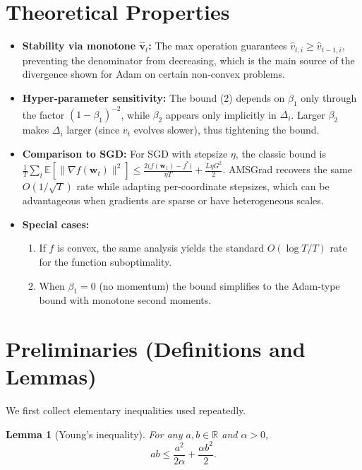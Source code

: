 \documentclass[11pt]{article}
\newtheorem{lemma}{Lemma}
\newcommand{\EE}{\mathbb{E}}
\newcommand{\RR}{\mathbb{R}}
\begin{document}
\section{Theoretical Properties}
\label{sec:properties}
\begin{itemize}[leftmargin=*]
\item \textbf{Stability via monotone $\hat{\mathbf{v}}_{t}$:}
The max operation guarantees $\hat{v}_{t,i}\ge\hat{v}_{t-1,i}$,
preventing the denominator from decreasing, which is the main
source of the divergence shown for Adam on certain non‑convex problems.

\item \textbf{Hyper‑parameter sensitivity:}
The bound (2) depends on $\beta_{1}$ only through the factor
$(1-\beta_{1})^{-2}$, while $\beta_{2}$ appears only implicitly in
$\Delta_{i}$.  Larger $\beta_{2}$ makes $\Delta_{i}$ larger (since
$v_{t}$ evolves slower), thus tightening the bound.

\item \textbf{Comparison to SGD:}
For SGD with stepsize $\eta$, the classic bound is
$\frac{1}{T}\sum_{t}\EE[\|\nabla f(\mathbf{w}_{t})\|^{2}]
\le \frac{2\bigl(f(\mathbf{w}_{1})-f^{*}\bigr)}{\eta T}
+\frac{L\eta G^{2}}{2}$.
AMSGrad recovers the same $O(1/\sqrt{T})$ rate while adapting per‑coordinate
stepsizes, which can be advantageous when gradients are sparse or have
heterogeneous scales.

\item \textbf{Special cases:}
\begin{enumerate}
\item If $f$ is convex, the same analysis yields the standard $O(\log T /T)$
rate for the function suboptimality.
\item When $\beta_{1}=0$ (no momentum) the bound simplifies to the
Adam‑type bound with monotone second moments.
\end{enumerate}
\end{itemize}

\section{Preliminaries (Definitions and Lemmas)}
\label{sec:prelim}
We first collect elementary inequalities used repeatedly.

\begin{lemma}[Young’s inequality]\label{lem:young}
For any $a,b\in\RR$ and $\alpha>0$,
\[
ab\le\frac{a^{2}}{2\alpha}+\frac{\alpha b^{2}}{2}.
\tag{L1}
\]
\end{lemma}
\end{document}
